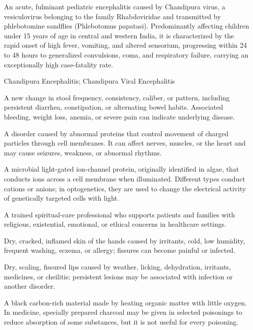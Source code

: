  An acute, fulminant pediatric encephalitis caused by Chandipura virus, a vesiculovirus belonging to the family Rhabdoviridae and transmitted by phlebotomine sandflies (Phlebotomus papatasi). Predominantly affecting children under 15 years of age in central and western India, it is characterized by the rapid onset of high fever, vomiting, and altered sensorium, progressing within 24 to 48 hours to generalized convulsions, coma, and respiratory failure, carrying an exceptionally high case-fatality rate.

\synonyms
Chandipura Encephalitis; Chandipura Viral Encephalitis

 A new change in stool frequency, consistency, caliber, or pattern, including persistent diarrhea, constipation, or alternating bowel habits. Associated bleeding, weight loss, anemia, or severe pain can indicate underlying disease.

 A disorder caused by abnormal proteins that control movement of charged particles through cell membranes. It can affect nerves, muscles, or the heart and may cause seizures, weakness, or abnormal rhythms.

 A microbial light-gated ion-channel protein, originally identified in algae, that conducts ions across a cell membrane when illuminated. Different types conduct cations or anions; in optogenetics, they are used to change the electrical activity of genetically targeted cells with light.

 A trained spiritual-care professional who supports patients and families with religious, existential, emotional, or ethical concerns in healthcare settings.

 Dry, cracked, inflamed skin of the hands caused by irritants, cold, low humidity, frequent washing, eczema, or allergy; fissures can become painful or infected.

 Dry, scaling, fissured lips caused by weather, licking, dehydration, irritants, medicines, or cheilitis; persistent lesions may be associated with infection or another disorder.

 A black carbon-rich material made by heating organic matter with little oxygen. In medicine, specially prepared charcoal may be given in selected poisonings to reduce absorption of some substances, but it is not useful for every poisoning.

